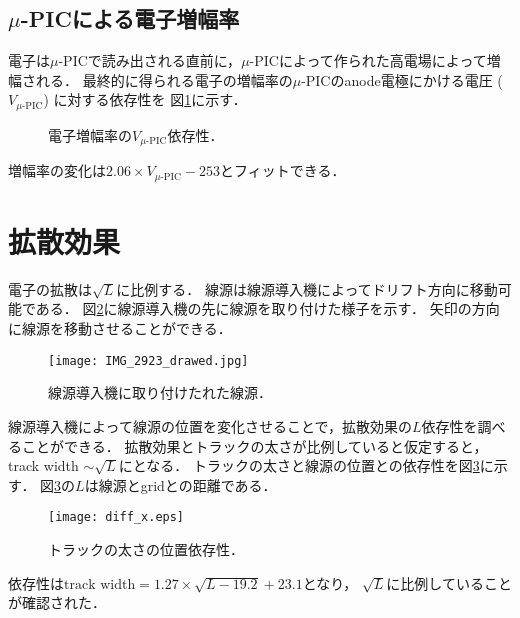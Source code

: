 \documentclass[../master]{subfiles}
\begin{document}
\subsection{$\mu$-PICによる電子増幅率}
電子は$\mu$-PICで読み出される直前に，$\mu$-PICによって作られた高電場によって増幅される．
最終的に得られる電子の増幅率の$\mu$-PICのanode電極にかける電圧 ($V_{\mu\text{-PIC}}$) に対する依存性を
図\ref{fig::gain_uPIC_V_dep}に示す．
\begin{figure}
  \centering
  \scalebox{0.7}{}
  \caption{電子増幅率の$V_{\mu\text{-PIC}}$依存性．}
  \label{fig::gain_uPIC_V_dep}
\end{figure}
増幅率の変化は$2.06\times{V_{\mu\text{-PIC}}}-253$とフィットできる．

\section{拡散効果}
電子の拡散は$\sqrt{L}$に比例する．
線源は線源導入機によってドリフト方向に移動可能である．
図\ref{pic::source_insirtion}に線源導入機の先に線源を取り付けた様子を示す．
矢印の方向に線源を移動させることができる．
\begin{figure}
  \centering
  \texttt{[image: IMG\_2923\_drawed.jpg]}
  \caption{線源導入機に取り付けたれた線源．}
  \label{pic::source_insirtion}
\end{figure}
線源導入機によって線源の位置を変化させることで，拡散効果の$L$依存性を調べることができる．
拡散効果とトラックの太さが比例していると仮定すると，track width $\sim\sqrt{L}$にとなる．
トラックの太さと線源の位置との依存性を図\ref{fig::diff_x}に示す．
図\ref{fig::diff_x}の$L$は線源とgridとの距離である．
\begin{figure}
  \centering
  \texttt{[image: diff\_x.eps]}
  \caption{トラックの太さの位置依存性．}
  \label{fig::diff_x}
\end{figure}
依存性は$\text{track width} = 1.27\times\sqrt{L-19.2}+23.1$となり，
$\sqrt{L}$に比例していることが確認された．

\end{document}
